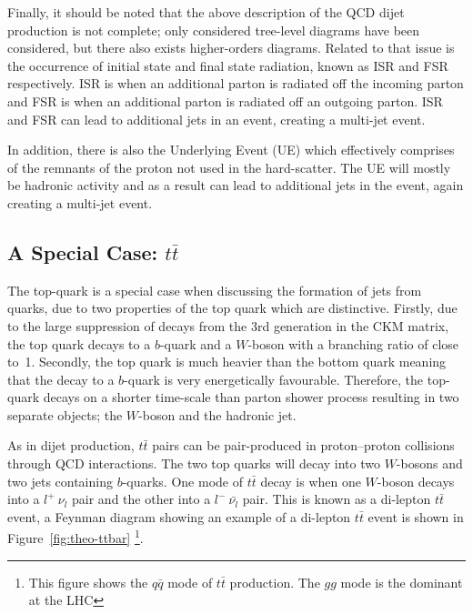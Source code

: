 Finally, it should be noted that the above description of the QCD dijet production is not complete;
only considered tree-level diagrams have been considered, but there also exists higher-orders diagrams.
Related to that issue is the occurrence of initial state and final state radiation, known as ISR and FSR respectively.
ISR is when an additional parton is radiated off the incoming parton and FSR is when an additional parton is radiated off an outgoing parton.
ISR and FSR can lead to additional jets in an event, creating a multi-jet event.

In addition, there is also the Underlying Event (UE) which effectively comprises of the remnants of the proton not used in the hard-scatter.
The UE will mostly be hadronic activity and as a result can lead to additional jets in the event, again creating a multi-jet event.

\subsection{A Special Case: $t\bar{t}$}
\label{sec:theo-ttbar}

The top-quark is a special case when discussing the formation of jets from quarks,
due to two properties of the top quark which are distinctive.
Firstly, due to the large suppression of decays from the 3rd generation in the CKM matrix,
the top quark decays to a $b$-quark and a $W$-boson with a branching ratio of close to~1.
Secondly, the top quark is much heavier than the bottom quark
meaning that the decay to a $b$-quark is very energetically favourable.
Therefore, the top-quark decays on a shorter time-scale than parton shower process
resulting in two separate objects; the $W$-boson and the hadronic jet.

As in dijet production, $t\bar{t}$ pairs can be pair-produced in proton--proton collisions through QCD interactions.
The two top quarks will decay into two $W$-bosons and two jets containing $b$-quarks.
One mode of $t\bar{t}$ decay is when one $W$-boson decays into a $l^+~\nu_l$ pair and the other into a $l^{-}~\bar{\nu_l}$ pair.
This is known as a di-lepton $t\bar{t}$ event, a Feynman diagram showing an example of a di-lepton $t\bar{t}$ event is shown in
Figure~\ref{fig:theo-ttbar} \footnote{ This figure shows the $q\bar{q}$ mode of $t\bar{t}$ production. The $gg$ mode is the dominant at the LHC}.

